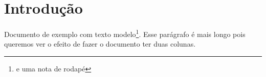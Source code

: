 \documentclass[twocolumn, chapterprefix, headings=small, numbers=enddot]{scrreprt}
\begin{document}
\chapter{Introdução}

Documento de exemplo com texto modelo\footnote{e uma nota de rodapé}. Esse parágrafo é mais longo pois queremos ver o efeito de fazer o documento ter duas colunas.
\end{document}
